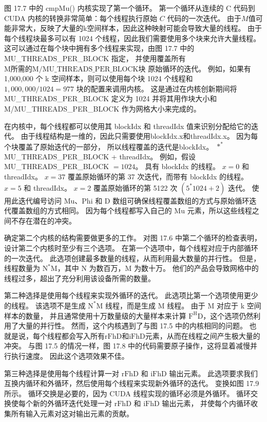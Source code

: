 图 17.7 中的 cmpMu() 内核实现了第一个循环。 
第一个循环从连续的 $\mathrm{C}$ 代码到 CUDA 内核的转换非常简单：每个线程执行原始 $C$ 代码的一次迭代。 
由于$M$值可能非常大，反映了大量的k空间样本，因此这种映射可能会导致大量的线程。 
由于每个线程块最多可以有 1024 个线程，因此我们需要使用多个块来允许大量线程。 
这可以通过在每个块中拥有多个线程来实现，由图 17.7 中的 MU\_THREADS\_PER\_BLOCK 指定，
并使用覆盖所有 $\mathrm{M 所需的 M/MU\_THREADS\_PER\_BLOCK 块 }$ 原始循环的迭代。 
例如，如果有 1,000,000 个 k 空间样本，则可以使用每个块 1024 个线程和 $1,000,000 / 1024=977$ 块的配置来调用内核。 
这是通过在内核创新期间将 MU\_THREADS\_PER\_BLOCK 定义为 1024 
并将其用作块大小和 M/MU\_THREADS\_PER\_BLOCK 作为网格大小来完成的。

在内核中，每个线程都可以使用其 blockIdx 和 threadIdx 值来识别分配给它的迭代。 
由于线程结构是一维的，因此只需要使用blockIdx.x和threadIdx.x。 因为每个块覆盖了原始迭代的一部分，
所以线程覆盖的迭代是blockIdx。 $*^{*}$ MU\_THREADS\_PER\_BLOCK + threadIdx。 
例如，假设 MU\_THREADS\_PER\_BLOCK $=1024$。 具有 blockIdx 的线程。 $x=0$ 和 threadIdx。 
$x=37$ 覆盖原始循环的第 37 次迭代，而带有 blockIdx 的线程。 $x=5$ 和 threadIdx。 
$x=2$ 覆盖原始循环的第 5122 次 $\left(5^{*} 1024+2\right)$ 迭代。 
使用此迭代编号访问 $\mathrm{Mu}$、Phi 和 D 数组可确保线程覆盖数组的方式与原始循环迭代覆盖数组的方式相同。 
因为每个线程都写入自己的 $\mathrm{Mu}$ 元素，所以这些线程之间不存在潜在的冲突。

确定第二个内核的结构需要做更多的工作。 对图 17.6 中第二个循环的检查表明，设计第二个内核时至少有三个选项。 
在第一个选项中，每个线程对应于内部循环的一次迭代。 此选项创建最多数量的线程，从而利用最大数量的并行性。 
但是，线程数量为 $\mathrm{N}^{*} \mathrm{M}$，其中 $\mathrm{N}$ 为数百万，$\mathrm{M}$ 为数十万。 
他们的产品会导致网格中的线程过多，超出了充分利用该设备所需的数量。

第二种选择是使用每个线程来实现外循环的迭代。 此选项比第一个选项使用更少的线程。 
该选项不是生成 $\mathrm{N}^{*} \mathrm{M}$ 线程，而是生成 $\mathrm{M}$ 线程。 
由于 $\mathrm{M}$ 对应于 k 空间样本的数量，
并且通常使用十万数量级的大量样本来计算 $\mathrm{F}^{\mathrm{H} } \mathrm{D}$，这个选项仍然利用了大量的并行性。 
然而，这个内核遇到了与图 17.5 中的内核相同的问题。 
也就是说，每个线程都会写入所有$\mathrm{rFhD}$和$\mathrm{iFhD}$元素，从而在线程之间产生极大量的冲突。 
与图 17.5 的情况一样，图 17.8 中的代码需要原子操作，这将显着减慢并行执行速度。 因此这个选项效果不佳。

第三种选择是使用每个线程计算一对 $\mathrm{rFhD}$ 和 $\mathrm{iFhD}$ 输出元素。 
此选项要求我们互换内循环和外循环，然后使用每个线程来实现新外循环的迭代。 
变换如图 17.9 所示。 循环交换是必要的，因为 CUDA 线程实现的循环必须是外循环。 
循环交换使每个新的外循环迭代处理一对 $\mathrm{rFhD}$ 和 $\mathrm{iFhD}$ 输出元素，
并使每个内循环收集所有输入元素对这对输出元素的贡献。

